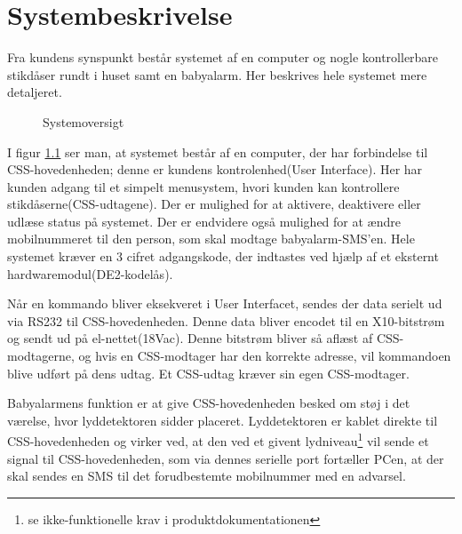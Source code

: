 \chapter{Systembeskrivelse}

Fra kundens synspunkt består systemet af en computer og nogle kontrollerbare stikdåser rundt i huset samt en babyalarm. Her beskrives hele systemet mere detaljeret.

\begin{figure}[H] \centering
{}
\caption{Systemoversigt}
\label{fig:sys_oversigt}
\end{figure}

I figur \ref{fig:sys_oversigt} ser man, at systemet består af en computer, der har forbindelse til CSS-hovedenheden; denne er kundens kontrolenhed(User Interface). Her har kunden adgang til et simpelt menusystem, hvori kunden kan kontrollere stikdåserne(CSS-udtagene). Der er mulighed for at aktivere, deaktivere eller udlæse status på systemet. Der er endvidere også mulighed for at ændre mobilnummeret til den person, som skal modtage babyalarm-SMS'en. Hele systemet kræver en 3 cifret adgangskode, der indtastes ved hjælp af et eksternt hardwaremodul(DE2-kodelås).

Når en kommando bliver eksekveret i User Interfacet, sendes der data serielt ud via RS232 til CSS-hovedenheden. Denne data bliver encodet til en X10-bitstrøm og sendt ud på el-nettet(18Vac). Denne bitstrøm bliver så aflæst af CSS-modtagerne, og hvis en CSS-modtager har den korrekte adresse, vil kommandoen blive udført på dens udtag. Et CSS-udtag kræver sin egen CSS-modtager.

Babyalarmens funktion er at give CSS-hovedenheden besked om støj i det værelse, hvor lyddetektoren sidder placeret. Lyddetektoren er kablet direkte til CSS-hovedenheden og virker ved, at den ved et givent lydniveau\footnote{se ikke-funktionelle krav i produktdokumentationen} vil sende et signal til CSS-hovedenheden, som via dennes serielle port fortæller PCen, at der skal sendes en SMS til det forudbestemte mobilnummer med en advarsel.

